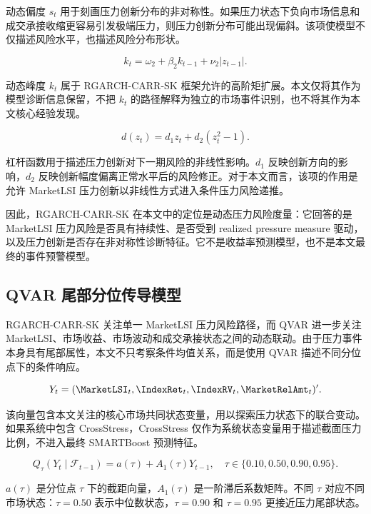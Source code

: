 动态偏度 $s_t$ 用于刻画压力创新分布的非对称性。如果压力状态下负向市场信息和成交承接收缩更容易引发极端压力，则压力创新分布可能出现偏斜。该项使模型不仅描述风险水平，也描述风险分布形状。

\begin{equation}
k_t=\omega_2+\beta_2k_{t-1}+\nu_2 |z_{t-1}|.
\end{equation}

动态峰度 $k_t$ 属于 RGARCH-CARR-SK 框架允许的高阶矩扩展。本文仅将其作为模型诊断信息保留，不把 $k_t$ 的路径解释为独立的市场事件识别，也不将其作为本文核心经验发现。

\begin{equation}
d(z_t)=d_1 z_t+d_2(z_t^2-1).
\end{equation}

杠杆函数用于描述压力创新对下一期风险的非线性影响。$d_1$ 反映创新方向的影响，$d_2$ 反映创新幅度偏离正常水平后的风险修正。对于本文而言，该项的作用是允许 MarketLSI 压力创新以非线性方式进入条件压力风险递推。

因此，RGARCH-CARR-SK 在本文中的定位是动态压力风险度量：它回答的是 MarketLSI 压力风险是否具有持续性、是否受到 realized pressure measure 驱动，以及压力创新是否存在非对称性诊断特征。它不是收益率预测模型，也不是本文最终的事件预警模型。

\subsection{QVAR 尾部分位传导模型}

RGARCH-CARR-SK 关注单一 MarketLSI 压力风险路径，而 QVAR 进一步关注 MarketLSI、市场收益、市场波动和成交承接状态之间的动态联动。由于压力事件本身具有尾部属性，本文不只考察条件均值关系，而是使用 QVAR 描述不同分位点下的条件响应。

\begin{equation}
Y_t = (\MarketLSI_t, \IndexRet_t, \IndexRV_t, \MarketRelAmt_t)'.
\end{equation}

该向量包含本文关注的核心市场共同状态变量，用以探索压力状态下的联合变动。如果系统中包含 CrossStress，CrossStress 仅作为系统状态变量用于描述截面压力比例，不进入最终 SMARTBoost 预测特征。

\begin{equation}
Q_{\tau}(Y_t \mid \mathcal{F}_{t-1})
=
a(\tau)+A_1(\tau)Y_{t-1},
\quad
\tau \in \{0.10,0.50,0.90,0.95\}.
\end{equation}

$a(\tau)$ 是分位点 $\tau$ 下的截距向量，$A_1(\tau)$ 是一阶滞后系数矩阵。不同 $\tau$ 对应不同市场状态：$\tau=0.50$ 表示中位数状态，$\tau=0.90$ 和 $\tau=0.95$ 更接近压力尾部状态。

